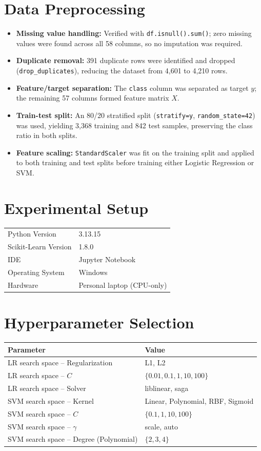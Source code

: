 \documentclass[12pt,a4paper]{article}
\begin{document}
\section{Data Preprocessing}
\begin{itemize}
\item \textbf{Missing value handling:} Verified with \texttt{df.isnull().sum()}; zero missing
values were found across all 58 columns, so no imputation was required.
\item \textbf{Duplicate removal:} 391 duplicate rows were identified and dropped
(\texttt{drop\_duplicates}), reducing the dataset from 4{,}601 to 4{,}210 rows.
\item \textbf{Feature/target separation:} The \texttt{class} column was separated as target $y$;
the remaining 57 columns formed feature matrix $X$.
\item \textbf{Train-test split:} An 80/20 stratified split (\texttt{stratify=y},
\texttt{random\_state=42}) was used, yielding 3{,}368 training and 842 test samples, preserving
the class ratio in both splits.
\item \textbf{Feature scaling:} \texttt{StandardScaler} was fit on the training split and applied
to both training and test splits before training either Logistic Regression or SVM.
\end{itemize}

\section{Experimental Setup}
\begin{tabular}{ll}
\toprule
Python Version & 3.13.15 \\
Scikit-Learn Version & 1.8.0 \\
IDE & Jupyter Notebook \\
Operating System & Windows \\
Hardware & Personal laptop (CPU-only) \\
\bottomrule
\end{tabular}

\section{Hyperparameter Selection}
\begin{tabular}{ll}
\toprule
Parameter & Value\\
\midrule
LR search space -- Regularization & L1, L2 \\
LR search space -- $C$ & $\{0.01, 0.1, 1, 10, 100\}$ \\
LR search space -- Solver & liblinear, saga \\
SVM search space -- Kernel & Linear, Polynomial, RBF, Sigmoid \\
SVM search space -- $C$ & $\{0.1, 1, 10, 100\}$ \\
SVM search space -- $\gamma$ & scale, auto \\
SVM search space -- Degree (Polynomial) & $\{2, 3, 4\}$ \\
\bottomrule
\end{tabular}
\end{document}
